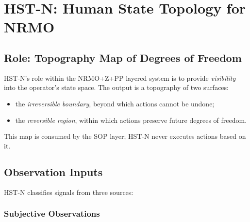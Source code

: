 
\chapter{HST-N: Human State Topology for NRMO}
\label{ch:hst-n}


\section{Role: Topography Map of Degrees of Freedom}
\label{sec:hstn-role-topography}

HST-N's role within the NRMO+Z+PP layered system is to provide
\emph{visibility} into the operator's state space. The output is a
topography of two surfaces:

\begin{itemize}
\item the \emph{irreversible boundary}, beyond which actions cannot
be undone;
\item the \emph{reversible region}, within which actions preserve
future degrees of freedom.
\end{itemize}

\noindent
This map is consumed by the SOP layer; HST-N never executes actions
based on it.

\section{Observation Inputs}
\label{sec:hstn-observation-inputs}

HST-N classifies signals from three sources:

\subsection{Subjective Observations}

